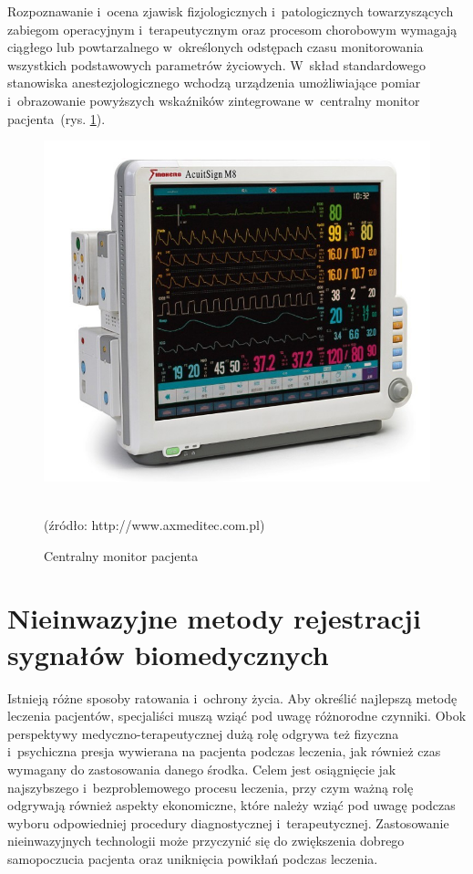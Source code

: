 Rozpoznawanie i~ocena zjawisk fizjologicznych i~patologicznych towarzyszących zabiegom operacyjnym i~terapeutycznym oraz procesom chorobowym wymagają 
ciągłego lub powtarzalnego w~określonych odstępach czasu monitorowania wszystkich podstawowych parametrów życiowych. W~skład standardowego 
stanowiska anestezjologicznego wchodzą urządzenia umożliwiające pomiar i~obrazowanie powyższych wskaźników zintegrowane w~centralny monitor 
pacjenta~(rys. \ref{rys:central_monitor}).
\begin{figure}[!h]
	\centerline{\includegraphics[scale = 0.45]{graphic/patient_monitor.jpg}}
	\caption{Centralny monitor pacjenta}
	~\\	 
	(źródło: http://www.axmeditec.com.pl)
	\label{rys:central_monitor}
\end{figure}

\section*{Nieinwazyjne metody rejestracji sygnałów biomedycznych}
\label{sec:MetodyPomiarow}

Istnieją różne sposoby ratowania i~ochrony życia. Aby określić najlepszą metodę leczenia pacjentów, specjaliści muszą wziąć pod uwagę różnorodne 
czynniki. Obok perspektywy medyczno-terapeutycznej dużą rolę odgrywa też fizyczna i~psychiczna presja wywierana na pacjenta podczas leczenia, 
jak również czas wymagany do zastosowania danego środka. Celem jest osiągnięcie jak najszybszego i~bezproblemowego procesu leczenia, przy czym 
ważną rolę odgrywają również aspekty ekonomiczne, które należy wziąć pod uwagę podczas wyboru odpowiedniej procedury diagnostycznej i~terapeutycznej. 
Zastosowanie nieinwazyjnych technologii może przyczynić się do zwiększenia dobrego samopoczucia pacjenta oraz uniknięcia powikłań podczas leczenia.

